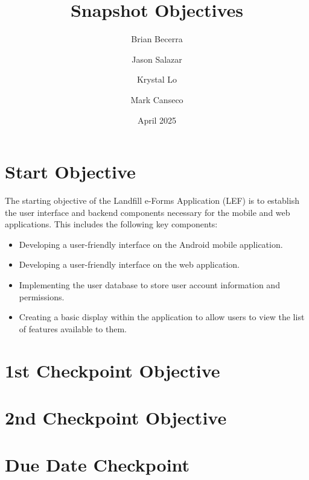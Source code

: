 \documentclass[12pt]{article}
\title{Snapshot Objectives}
\author{
    Brian Becerra\\
    \and
    Jason Salazar\\
    \and
    Krystal Lo\\
    \and
    Mark Canseco\\
    }
\date{April 2025}
\begin{document}
\begin{titlepage}
\maketitle
\thispagestyle{empty}
\end{titlepage}

\section*{Start Objective}
The starting objective of the Landfill e-Forms Application (LEF) is to establish the user interface and backend components necessary for the mobile and web applications. This includes the following key components:\\
\begin{itemize}
    \item Developing a user-friendly interface on the Android mobile application.
    \item  Developing a user-friendly interface on the web application.
    \item Implementing the user database to store user account information and permissions.
    \item Creating a basic display within the application to allow users to view the list of features available to them.
\end{itemize}

\section*{1st Checkpoint Objective}

\section*{2nd Checkpoint Objective}

\section*{Due Date Checkpoint}
\end{document}
